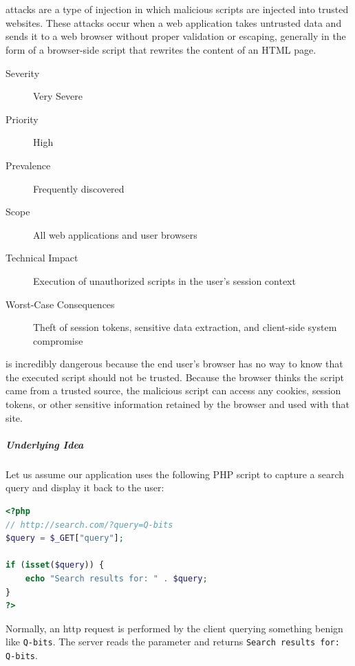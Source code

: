 \chapter{}
 attacks are a type of injection in which malicious scripts are injected into trusted websites. These attacks occur when a web application takes untrusted data and sends it to a web browser without proper validation or escaping, generally in the form of a browser-side script that rewrites the content of an HTML page. 

\begin{description}
    \item[Severity] Very Severe
    \item[Priority] High
    \item[Prevalence] Frequently discovered
    \item[Scope] All web applications and user browsers
    \item[Technical Impact] Execution of unauthorized scripts in the user's session context
    \item[Worst-Case Consequences] Theft of session tokens, sensitive data extraction, and client-side system compromise
\end{description}

\noindent {} is incredibly dangerous because the end user's browser has no way to know that the executed script should not be trusted. Because the browser thinks the script came from a trusted source, the malicious script can access any cookies, session tokens, or other sensitive information retained by the browser and used with that site.

\paragraph{Underlying Idea}
Let us assume our application uses the following PHP script to capture a search query and display it back to the user:

\begin{lstlisting}[language=PHP]
<?php
// http://search.com/?query=Q-bits
$query = $_GET["query"];

if (isset($query)) {
    echo "Search results for: " . $query;
}
?>
\end{lstlisting}

Normally, an \gls{http} request is performed by the client querying something benign like \texttt{Q-bits}. The server reads the parameter and returns \texttt{Search results for: Q-bits}.

